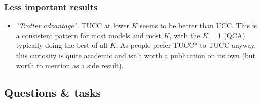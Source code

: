 \documentclass[10pt, a4paper]{article}
\begin{document}
\subsubsection*{Less important results}
\begin{itemize}
\item \textit{"Trotter advantage".} TUCC at lower $K$ seems to be better than UCC. This is a consistent pattern for most models and most $K$, with the $K=1$ (QCA) typically doing the best of all $K$. As people prefer TUCC* to TUCC anyway, this curiosity is quite academic and isn't worth a publication on its own (but worth to mention as a side result).
\end{itemize}

\subsection*{Questions \& tasks}
\end{document}
